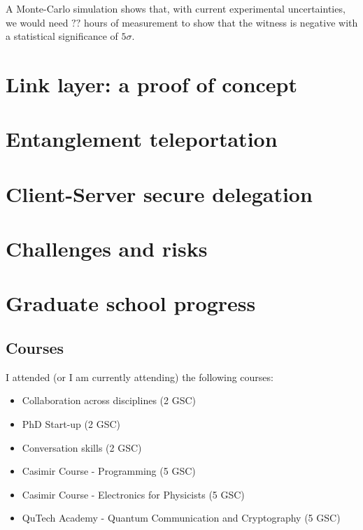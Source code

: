 \documentclass[a4paper, twoside]{article}
\begin{document}
A Monte-Carlo simulation shows that, with current experimental uncertainties, we would need $??$ hours of measurement to show that the witness is negative with a statistical significance of $5\sigma$.

\section{Link layer: a proof of concept}

\section{Entanglement teleportation}

\section{Client-Server secure delegation}

\section{Challenges and risks}

\section{Graduate school progress}
\subsection{Courses}
I attended (or I am currently attending) the following courses:
\begin{itemize}
	\item Collaboration across disciplines (2 GSC) 
	\item PhD Start-up (2 GSC)
	\item Conversation skills (2 GSC)
	\item Casimir Course - Programming (5 GSC)
	\item Casimir Course - Electronics for Physicists (5 GSC)
	\item QuTech Academy - Quantum Communication and Cryptography (5 GSC)
\end{itemize}
\end{document}

